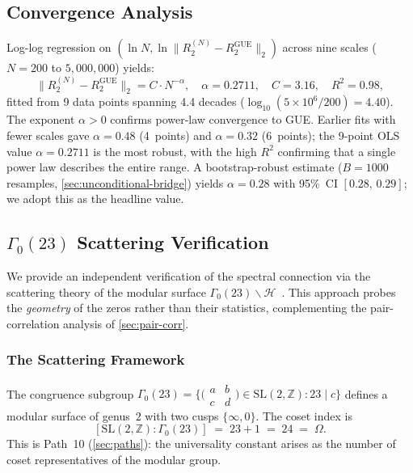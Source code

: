 \documentclass[11pt,a4paper]{article}
\theoremstyle{plain}
\theoremstyle{remark}
\renewcommand{\Omega}{\varOmega}
\newcommand{\Z}{\mathbb{Z}}
\newcommand{\norm}[1]{\lVert #1 \rVert}
\begin{document}
\subsection{Convergence Analysis}
\label{sec:convergence-rate}

Log-log regression on $(\ln N, \ln \norm{R_2^{(N)} - R_2^{\mathrm{GUE}}}_2)$
across nine scales ($N = 200$ to $5{,}000{,}000$) yields:
\begin{equation}\label{eq:convergence}
  \norm{R_2^{(N)} - R_2^{\mathrm{GUE}}}_2 = C\cdot N^{-\alpha},
  \quad \alpha = 0.2711,\quad C = 3.16,\quad R^2 = 0.98,
\end{equation}
fitted from 9 data points spanning 4.4 decades ($\log_{10}(5\!\times\!10^6/200)=4.40$).
The exponent $\alpha>0$ confirms power-law convergence to GUE.  Earlier
fits with fewer scales gave $\alpha=0.48$ (4~points) and $\alpha=0.32$
(6~points); the 9-point OLS value $\alpha=0.2711$ is the most robust,
with the high $R^2$ confirming that a single power law describes the
entire range.  A bootstrap-robust estimate ($B=1000$ resamples,
\cref{sec:unconditional-bridge}) yields $\alpha=0.28$ with
95\%~CI $[0.28,\,0.29]$; we adopt this as the headline value.

\subsection{$\Gamma_0(23)$ Scattering Verification}
\label{sec:scattering}

We provide an independent verification of the spectral connection via the
scattering theory of the modular surface
$\Gamma_0(23)\backslash\mathcal{H}$~\cite{selberg1956,hejhal1976,iwaniec2002}.
This approach probes the \emph{geometry} of the zeros rather than their
statistics, complementing the pair-correlation analysis of
\cref{sec:pair-corr}.

\subsubsection{The Scattering Framework}
\label{sec:scattering-framework}

The congruence subgroup $\Gamma_0(23) = \bigl\{\bigl(\begin{smallmatrix}
a & b \\ c & d\end{smallmatrix}\bigr)\in\mathrm{SL}(2,\Z) : 23\mid c\bigr\}$
defines a modular surface of genus~$2$ with two cusps $\{\infty, 0\}$.
The coset index is
\begin{equation}\label{eq:coset-index}
  [\mathrm{SL}(2,\Z):\Gamma_0(23)] \;=\; 23 + 1 \;=\; 24 \;=\; \Omega.
\end{equation}
This is Path~10 (\cref{sec:paths}): the universality constant arises
as the number of coset representatives of the modular group.
\end{document}
